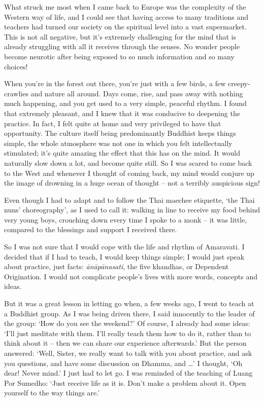 What struck me most when I came back to Europe was the complexity of the Western way of life, and I could see that having access to many traditions and teachers had turned our society on the spiritual level into a vast supermarket. This is not all negative, but it's extremely challenging for the mind that is already struggling with all it receives through the senses. No wonder people become neurotic after being exposed to so much information and so many choices!

When you're in the forest out there, you're just with a few birds, a few creepy-crawlies and nature all around. Days come, rise, and pass away with nothing much happening, and you get used to a very simple, peaceful rhythm. I found that extremely pleasant, and I knew that it was conducive to deepening the practice. In fact, I felt quite at home and very privileged to have that opportunity. The culture itself being predominantly Buddhist keeps things simple, the whole atmosphere was not one in which you felt intellectually stimulated; it's quite amazing the effect that this has on the mind. It would naturally slow down a lot, and become quite still. So I was scared to come back to the West and whenever I thought of coming back, my mind would conjure up the image of drowning in a huge ocean of thought -- not a terribly auspicious sign!

Even though I had to adapt and to follow the Thai maechee etiquette, `the Thai nuns' choreography', as I used to call it: walking in line to receive my food behind very young boys, crouching down every time I spoke to a monk -- it was little, compared to the blessings and support I received there.

So I was not sure that I would cope with the life and rhythm of Amaravati. I decided that if I had to teach, I would keep things simple; I would just speak about practice, just facts: \textit{\=an\=ap\=anasati}, the five khandhas, or Dependent Origination. I would not complicate people's lives with more words, concepts and ideas.

But it was a great lesson in letting go when, a few weeks ago, I went to teach at a Buddhist group. As I was being driven there, I said innocently to the leader of the group: `How do you see the weekend?' Of course, I already had some ideas: `I'll just meditate with them. I'll really teach them how to do it, rather than to think about it -- then we can share our experience afterwards.' But the person answered: `Well, Sister, we really want to talk with you about practice, and ask you questions, and have some discussion on Dhamma, and \ldots{}' I thought, `Oh dear! Never mind.' I just had to let go. I was reminded of the teaching of Luang Por Sumedho: `Just receive life as it is. Don't make a problem about it. Open yourself to the way things are.'


